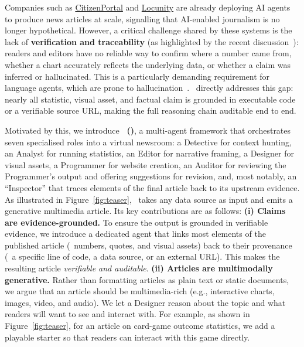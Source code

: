 Companies such as \href{https://citizenportal.ai/home}{CitizenPortal} and \href{https://www.locunity.com/#preview}{Locunity} are already deploying AI agents to produce news articles at scale, signalling that AI-enabled journalism is no longer hypothetical.
However, a critical challenge shared by these systems is the lack of \textbf{verification and traceability} (as highlighted by the recent discussion~\cite{rusch2025aicitycouncil}): 
readers and editors have no reliable way to confirm where a number came from, whether a chart accurately reflects the underlying data, or whether a claim was inferred or hallucinated.
This is a particularly demanding requirement for language agents, which are prone to hallucination~\cite{ji2023survey}.
\methodshort\ directly addresses this gap: nearly all statistic, visual asset, and factual claim is grounded in executable code or a verifiable source URL, making the full reasoning chain auditable end to end.



Motivated by this, we introduce \textbf{\method\ (\methodshort)}, a multi-agent framework that orchestrates seven specialised roles into a virtual newsroom: a Detective for context hunting, an Analyst for running statistics, an Editor for narrative framing, a Designer for visual assets, a Programmer for website creation, an Auditor for reviewing the Programmer's output and offering suggestions for revision, and, most notably, an “Inspector” that traces elements of the final article back to its upstream evidence.
As illustrated in Figure~\ref{fig:teaser}, \method\ takes any data source as input and emits a generative multimedia article. Its key contributions are as follows:
\textbf{(i) Claims are evidence-grounded.} To ensure the output is grounded in verifiable evidence, we introduce a dedicated agent that links most elements of the published article (\ie~numbers, quotes, and visual assets) back to their provenance (\ie~a specific line of code, a data source, or an external URL). This makes the resulting article \textit{verifiable and auditable}.
\textbf{(ii) Articles are multimodally generative.} Rather than formatting articles as plain text or static documents, we argue that an article should be multimedia-rich (e.g., interactive charts, images, video, and audio).
We let a Designer reason about the topic and what readers will want to see and interact with.
For example, as shown in Figure~\ref{fig:teaser}, for an article on card-game outcome statistics, we add a playable starter so that readers can interact with this game directly.


